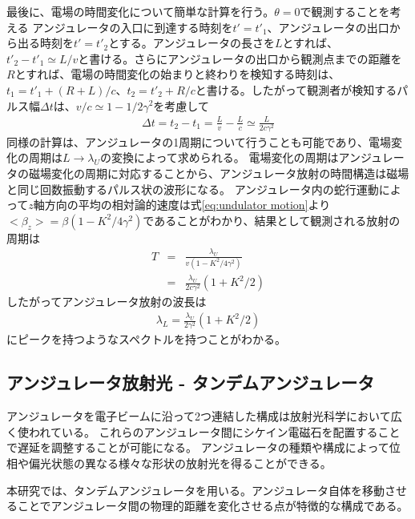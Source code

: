 \documentclass[a4paper,11pt,uplatex]{jsbook}
\begin{document}
最後に、電場の時間変化について簡単な計算を行う。$\theta = 0$で観測することを考える
アンジュレータの入口に到達する時刻を$t' = t'_1 $、アンジュレータの出口から出る時刻を$t' = t'_2$とする。アンジュレータの長さを$L$とすれば、
$t'_2 - t'_1 \simeq L / v$と書ける。さらにアンジュレータの出口から観測点までの距離を$R$とすれば、電場の時間変化の始まりと終わりを検知する時刻は、
$t_1 = t'_1 + (R + L)/c$、$t_2 = t'_2 + R/c$と書ける。したがって観測者が検知するパルス幅$\Delta t$は、$v/c \simeq 1- 1/2\gamma^2$を考慮して
\begin{eqnarray}
  \Delta t = t_2 - t_1 = \frac{L}{v}  - \frac{L}{c} \simeq \frac{L}{2c\gamma^2}
\end{eqnarray}
同様の計算は、アンジュレータの1周期について行うことも可能であり、電場変化の周期は$L\rightarrow \lambda_U$の変換によって求められる。
電場変化の周期はアンジュレータの磁場変化の周期に対応することから、アンジュレータ放射の時間構造は磁場と同じ回数振動するパルス状の波形になる。
アンジュレータ内の蛇行運動によって$z$軸方向の平均の相対論的速度は式\ref{eq:undulator motion}より$<\beta_z> =\beta (1-K^2/4\gamma^2)$であることがわかり、結果として観測される放射の周期は
\begin{eqnarray}
  T &=& \frac{\lambda_U}{v(1-K^2/4\gamma^2)} \\
  &=& \frac{\lambda_U}{2c\gamma^2}(1 + K^2/2)
\end{eqnarray}
したがってアンジュレータ放射の波長は
\begin{eqnarray}
  \lambda_L = \frac{\lambda_U}{2\gamma^2}(1+K^2/2)
\end{eqnarray}
にピークを持つようなスペクトルを持つことがわかる。

\subsection{アンジュレータ放射光 - タンデムアンジュレータ}\label{sec:tandem}
アンジュレータを電子ビームに沿って2つ連結した構成は放射光科学において広く使われている。
これらのアンジュレータ間にシケイン電磁石を配置することで遅延を調整することが可能になる。
アンジュレータの種類や構成によって位相や偏光状態の異なる様々な形状の放射光を得ることができる。

本研究では、タンデムアンジュレータを用いる。アンジュレータ自体を移動させることでアンジュレータ間の物理的距離を変化させる点が特徴的な構成である。
\end{document}
